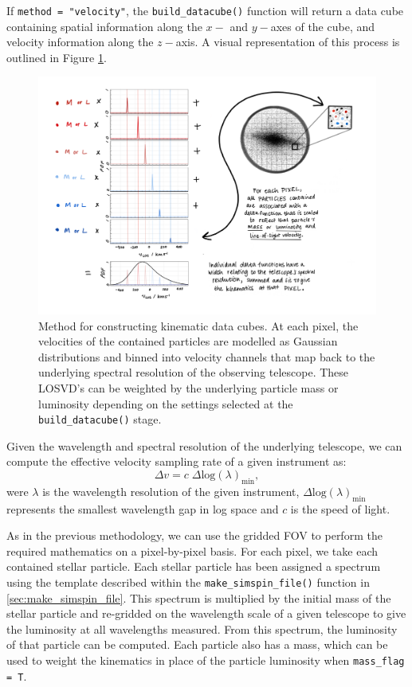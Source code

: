 \documentclass[
  journal=pasa,
  manuscript=research-paper, %
  year=2020,
  volume=37,
]{cup-journal}
\newcommand{\makesimspinfile}[1]{\texttt{make\_simspin\_file()}#1}
\newcommand{\builddatacube}[1]{\texttt{build\_datacube()}#1}
\begin{document}
If \texttt{method = "velocity"}, the \builddatacube{} function will return a data cube containing spatial information along the $x-$ and $y-$axes of the cube, and velocity information along the $z-$axis.  
A visual representation of this process is outlined in Figure \ref{fig:velocity_methodology}.

\begin{figure}
    \centering
    \includegraphics[keepaspectratio, width=14cm]{Figures/velocity_mode_methodology_v2.png}
    \caption{Method for constructing kinematic data cubes. At each pixel, the velocities of the contained particles are modelled as Gaussian distributions and binned into velocity channels that map back to the underlying spectral resolution of the observing telescope. These LOSVD's can be weighted by the underlying particle mass or luminosity depending on the settings selected at the \builddatacube{} stage.}
    \label{fig:velocity_methodology}
\end{figure}

Given the wavelength and spectral resolution of the underlying telescope, we can compute the effective velocity sampling rate of a given instrument as:
\begin{equation}
\label{eq:vel_res}
    \Delta v = c \; \Delta \text{log}(\lambda)_{\text{min}},
\end{equation}
were $\lambda$ is the wavelength resolution of the given instrument, $\Delta \text{log}(\lambda)_{\text{min}}$ represents the smallest wavelength gap in log space and $c$ is the speed of light. 

As in the previous methodology, we can use the gridded FOV to perform the required mathematics on a pixel-by-pixel basis. 
For each pixel, we take each contained stellar particle. 
Each stellar particle has been assigned a spectrum using the template described within the \makesimspinfile{} function in \cref{sec:make_simspin_file}. 
This spectrum is multiplied by the initial mass of the stellar particle and re-gridded on the wavelength scale of a given telescope to give the luminosity at all wavelengths measured.
From this spectrum, the luminosity of that particle can be computed. 
Each particle also has a mass, which can be used to weight the kinematics in place of the particle luminosity when \texttt{mass\_flag = T}.
\end{document}

